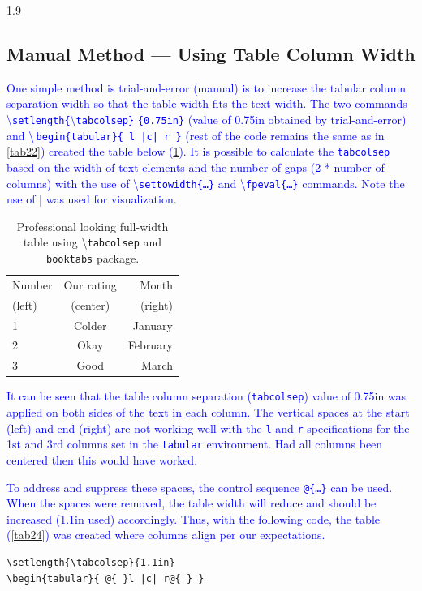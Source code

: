 \documentclass[phd]{ndsu-thesis-2022}
\newcommand\myspacing{1.9} %
\newcommand\italk[1]{\textcolor{blue}{#1}}  %
\newcommand\cmd[1]{\textbackslash\texttt{#1}}  %
\newcommand\vb[1]{\textcolor{blue}{\texttt{#1}}}%
\newcommand\vbc[1]{\textcolor{blue}{\textbackslash\,\texttt{#1}}}%
\begin{document}
\begin{spacing}{\myspacing}
\subsection{Manual Method --- Using Table Column Width}
\italk{One simple method is trial-and-error (manual) is to increase the tabular column separation width so that the table width fits the text width. The two commands \cmd{setlength\{}\cmd{tabcolsep\}} \vb{\{0.75in\}} (value of 0.75in obtained by trial-and-error) and \vbc{begin\{tabular\}\{ l    |c|    r \}} (rest of the code remains the same as in \cref{tab22}) created the table below (\cref{tab23}). It is possible to calculate the \vb{tabcolsep} based on the width of text elements and the number of gaps (2 * number of columns) with the use of \cmd{settowidth\{\ldots\}} and \cmd{fpeval\{\ldots\}} commands. Note the use of | was used for visualization.} 

\begin{table}[h!]
\centering
\caption{Professional looking full-width table using \cmd{tabcolsep} and \texttt{booktabs} package.}
\setlength{\tabcolsep}{0.75in}
\begin{tabular}{ l    |c|    r }
\toprule
Number & Our rating & Month \\
(left) & (center)   & (right)\\
\midrule
1 & Colder & January \\
2 & Okay   & February \\
3 & Good   & March\\
\bottomrule
\end{tabular}
\label{tab23}
\end{table}

\italk{It can be seen that the table column separation (\vb{tabcolsep}) value of 0.75in was applied on both sides of the text in each column. The vertical spaces at the start (left) and end (right) are not working well with the \vb{l} and \vb{r} specifications for the 1st and 3rd columns set in the \vb{tabular} environment. Had all columns been centered then this would have worked.}

\italk{To address and suppress these spaces, the control sequence \vb{@\{\ldots\}} can be used. When the spaces were removed, the table width will reduce and should be increased (1.1in used) accordingly. Thus, with the following code, the table (\cref{tab24}) was created where columns align per our expectations.
}

{\singlespacing
\begin{verbatim}
\setlength{\tabcolsep}{1.1in}
\begin{tabular}{ @{ }l |c| r@{ } }
\end{verbatim}
}


\end{spacing}
\end{document}
